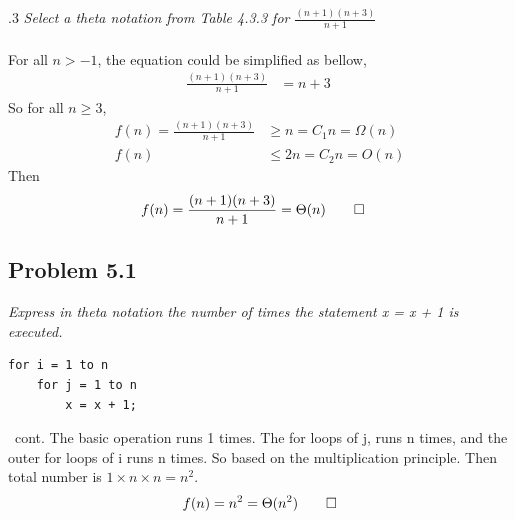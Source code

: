 \documentclass[handout]{beamer}
\begin{document}
        \begin{frame}[c,shrink]{\subsecname{}.3}
            \textit{Select a theta notation from Table 4.3.3 for $\frac{(n+1)(n+3)}{n+1}$}\\
            $\;$\\\pause  
            For all $n > -1$, the equation could be simplified as bellow,   
            \begin{align*}
                \frac{(n+1)(n+3)}{n+1}			&= n+3\ 
            \end{align*}\pause
            So for all $n \geq 3$,
            \begin{align*}
                f(n) = \frac{(n+1)(n+3)}{n+1} &\geq n = C_1n = \Omega(n)\\
                                         f(n) &\leq 2n = C_2n = O(n)
            \end{align*} \pause
            Then           
            \begin{align*}
                f(n) = \frac{(n+1)(n+3)}{n+1} &= \Theta(n) \qed
            \end{align*}
        \end{frame}
        
        
        
    \subsection{Problem 5.1}
    
        \begin{frame}[c,containsverbatim]{\subsecname}
            \textit{Express in theta notation the number of times the statement x = x + 1 is
executed.}
            \begin{lstlisting}
for i = 1 to n
    for j = 1 to n
        x = x + 1;
            \end{lstlisting}
        \end{frame}
        
        \begin{frame}[c]{\subsecname\ cont.}
            The basic operation runs 1 times. The for loops of j, runs n times, and the outer for loops of i runs n times. So based on the multiplication principle. Then total number is $1\times n \times n=n^2$.\pause
            \begin{align*}
            f(n)=n^2=\Theta(n^2) \qed
            \end{align*}
        \end{frame}
        
\end{document}
